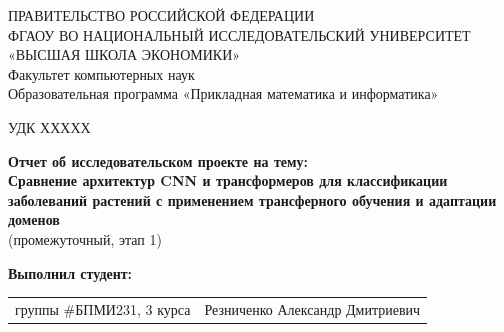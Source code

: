 \begin{titlepage}
\newpage

{
\begin{center}
ПРАВИТЕЛЬСТВО РОССИЙСКОЙ ФЕДЕРАЦИИ\\
ФГАОУ ВО НАЦИОНАЛЬНЫЙ ИССЛЕДОВАТЕЛЬСКИЙ УНИВЕРСИТЕТ\\
«ВЫСШАЯ ШКОЛА ЭКОНОМИКИ»
\\
\bigskip
Факультет компьютерных наук\\
Образовательная программа «Прикладная математика и информатика»
\end{center}
}

\vspace{2em}
УДК ХХХХХ %
\vspace{4em}

\begin{center}
{\bf Отчет об исследовательском проекте на тему:}\\
{\bf Сравнение архитектур CNN и трансформеров для классификации заболеваний растений с применением трансферного обучения и адаптации доменов}\\
(промежуточный, этап 1)
\end{center}

\vspace{2em}

{\bf Выполнил студент: \vspace{2mm}}

{
\begin{tabular}{l@{\hskip 1.5cm}l}
группы \#БПМИ231, 3 курса & Резниченко Александр Дмитриевич \\
\end{tabular}}



\end{titlepage}
